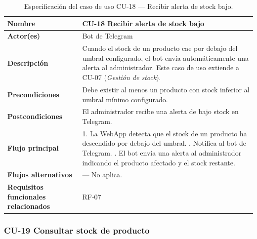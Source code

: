 \begin{table}[H]
\centering
\small
\begin{tabular}{|m{}|m{}|}
\hline
\textbf{Nombre} & CU-18 Recibir alerta de stock bajo \\ \hline
\textbf{Actor(es)} & Bot de Telegram \\ \hline
\textbf{Descripción} & Cuando el stock de un producto cae por debajo del umbral configurado, el bot envía automáticamente una alerta al administrador. Este caso de uso extiende a CU-07 (\textit{Gestión de stock}). \\ \hline
\textbf{Precondiciones} & Debe existir al menos un producto con stock inferior al umbral mínimo configurado. \\ \hline
\textbf{Postcondiciones} & El administrador recibe una alerta de bajo stock en Telegram. \\ \hline
\textbf{Flujo principal} & 1. La WebApp detecta que el stock de un producto ha descendido por debajo del umbral. \newline 2. Notifica al bot de Telegram. \newline 3. El bot envía una alerta al administrador indicando el producto afectado y el stock restante. \\ \hline
\textbf{Flujos alternativos} & — No aplica. \\ \hline
\textbf{Requisitos funcionales relacionados} & RF-07 \\ \hline
\end{tabular}
\caption{Especificación del caso de uso CU-18 — Recibir alerta de stock bajo.}
\end{table}

\subsubsection{CU-19 Consultar stock de producto}

